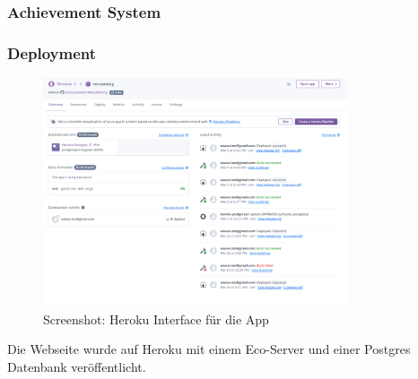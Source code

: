 \subsubsection*{Achievement System}
\subsubsection*{Deployment}

\begin{figure}[ht]
    \centering
    \includegraphics[width=0.8\textwidth]{images/Heroku.png}
    \caption{Screenshot: Heroku Interface für die App}
    \label{fig:r-deployment}
\end{figure}

Die Webseite wurde auf Heroku mit einem Eco-Server und einer Postgres Datenbank
veröffentlicht.




